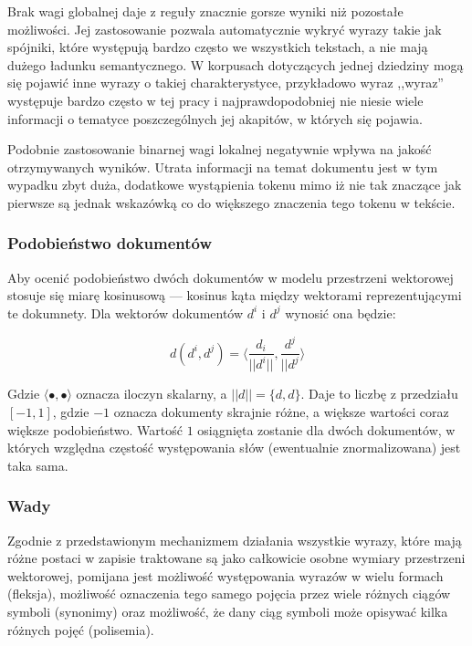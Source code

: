 \documentclass[11pt,a4paper]{article}
\begin{document}
Brak wagi globalnej daje z reguły znacznie gorsze wyniki niż pozostałe
możliwości. Jej zastosowanie pozwala automatycznie wykryć wyrazy takie jak
spójniki, które występują bardzo często we wszystkich tekstach, a nie mają
dużego ładunku semantycznego. W korpusach dotyczących jednej dziedziny mogą się
pojawić inne wyrazy o takiej charakterystyce, przykładowo wyraz ,,wyraz''
występuje bardzo często w tej pracy i najprawdopodobniej nie niesie wiele
informacji o tematyce poszczególnych jej akapitów, w których się pojawia.

Podobnie zastosowanie binarnej wagi lokalnej negatywnie wpływa na jakość
otrzymywanych wyników. Utrata informacji na temat dokumentu jest w tym wypadku
zbyt duża, dodatkowe wystąpienia tokenu mimo iż nie tak znaczące jak pierwsze
są jednak wskazówką co do większego znaczenia tego tokenu w tekście.

\subsubsection{Podobieństwo dokumentów}

Aby ocenić podobieństwo dwóch dokumentów w modelu przestrzeni wektorowej
stosuje się miarę kosinusową --- kosinus kąta między wektorami reprezentującymi
te dokumnety. Dla wektorów dokumentów $d^i$ i $d^j$ wynosić ona będzie:

\begin{equation}
  d(d^i, d^j) = \langle \frac{d_i}{||d^i||}, \frac{d^j}{||d^j} \rangle
\end{equation}

Gdzie $\langle \bullet, \bullet \rangle$ oznacza iloczyn skalarny, a $||d|| =
\lbrace d, d \rbrace$. Daje to liczbę z przedziału $[-1,1]$, gdzie $-1$ oznacza
dokumenty skrajnie różne, a większe wartości coraz większe podobieństwo.
Wartość $1$ osiągnięta zostanie dla dwóch dokumentów, w których względna
częstość występowania słów (ewentualnie znormalizowana) jest taka sama.

\subsubsection{Wady}

Zgodnie z przedstawionym mechanizmem działania wszystkie wyrazy, które mają
różne postaci w zapisie traktowane są jako całkowicie osobne wymiary
przestrzeni wektorowej, pomijana jest możliwość występowania wyrazów w wielu
formach (fleksja), możliwość oznaczenia tego samego pojęcia przez wiele różnych
ciągów symboli (synonimy) oraz możliwość, że dany ciąg symboli może opisywać
kilka różnych pojęć (polisemia).
\end{document}
